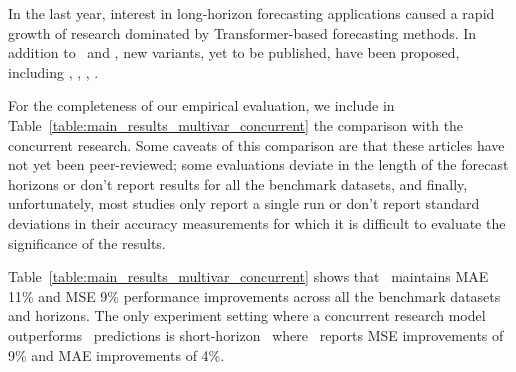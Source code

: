 In the last year, interest in long-horizon forecasting applications caused a rapid growth of research dominated by Transformer-based forecasting methods. In addition to \Autoformer\ and \Informer, new variants, yet to be published, have been proposed, including \FEDformer, \ETSformer, \Preformer, \Triformer \citep{zhouFEDformer2022, wooETSformer2022, dazhaoPreformer2022, cirsteaTRIFormer2022}. 

For the completeness of our empirical evaluation, we include in Table~\ref{table:main_results_multivar_concurrent} the comparison with the concurrent research. Some caveats of this comparison are that these articles have not yet been peer-reviewed; some evaluations deviate in the length of the forecast horizons or don't report results for all the benchmark datasets, and finally, unfortunately, most studies only report a single run or don't report standard deviations in their accuracy measurements for which it is difficult to evaluate the significance of the results.

Table~\ref{table:main_results_multivar_concurrent} shows that \ours\ maintains MAE 11\% and MSE 9\% performance improvements across all the benchmark datasets and horizons. The only experiment setting where a concurrent research model outperforms \ours\ predictions is short-horizon \Exchange\ where \ETSformer\ reports MSE improvements of 9\% and MAE improvements of 4\%.



